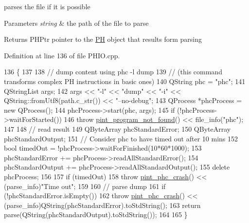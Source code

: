 parses the file if it is possible 


\begin{DoxyParams}{Parameters}
{\em string} & the path of the file to parse \\
\hline
\end{DoxyParams}
\begin{DoxyReturn}{Returns}
P\+H\+Ptr pointer to the \hyperlink{classPH}{P\+H} object that results form parsing 
\end{DoxyReturn}


Definition at line 136 of file P\+H\+I\+O.\+cpp.


\begin{DoxyCode}
136                                          \{
137 
138     \textcolor{comment}{// dump content using phc -l dump}
139     \textcolor{comment}{// (this command transforms complex PH instructions in basic ones)}
140     QString phc = \textcolor{stringliteral}{"phc"};
141     QStringList args;
142     args << \textcolor{stringliteral}{"-l"} << \textcolor{stringliteral}{"dump"} << \textcolor{stringliteral}{"-i"} << QString::fromUtf8(path.c\_str()) << \textcolor{stringliteral}{"--no-debug"};
143     QProcess *phcProcess = \textcolor{keyword}{new} QProcess();
144     phcProcess->start(phc, args);
145     \textcolor{keywordflow}{if} (!phcProcess->waitForStarted())
146         \textcolor{keywordflow}{throw} \hyperlink{structpint__program__not__found}{pint\_program\_not\_found}() << file\_info(\textcolor{stringliteral}{"phc"});
147 
148     \textcolor{comment}{// read result}
149     QByteArray phcStandardError;
150     QByteArray phcStandardOutput;
151     \textcolor{comment}{// Consider phc to have timed out after 10 mins}
152     \textcolor{keywordtype}{bool} timedOut = !phcProcess->waitForFinished(10*60*1000);
153     phcStandardError  += phcProcess->readAllStandardError();
154     phcStandardOutput += phcProcess->readAllStandardOutput();
155     \textcolor{keyword}{delete} phcProcess;
156 
157     \textcolor{keywordflow}{if} (timedOut)
158         \textcolor{keywordflow}{throw} \hyperlink{structpint__phc__crash}{pint\_phc\_crash}() << (parse\_info)\textcolor{stringliteral}{"Time out"};
159 
160     \textcolor{comment}{// parse dump}
161     \textcolor{keywordflow}{if} (!phcStandardError.isEmpty())
162         \textcolor{keywordflow}{throw} \hyperlink{structpint__phc__crash}{pint\_phc\_crash}() << (parse\_info)QString(phcStandardError).toStdString();
163     \textcolor{keywordflow}{return} parse(QString(phcStandardOutput).toStdString());
164 
165 \}
\end{DoxyCode}
